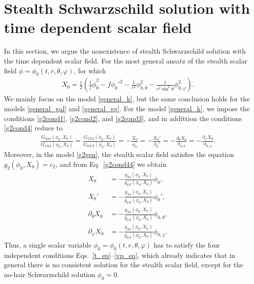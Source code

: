 \documentclass[prd,amsmath,amssymb,floatfix,superscriptaddress,notitlepage,nofootinbib,preprintnumbers]{revtex4-1}
\begin{document}
\section{Stealth Schwarzschild solution with time dependent scalar field}
\label{sec5}


In this section,
we argue the nonexistence of stealth Schwarzschild solution
with the time dependent scalar field. 
For the most general ansatz of the stealth scalar field $\phi=\phi_0(t,r,\theta,\varphi)$, for which
\begin{align}
X_0=\frac{1}{2}
\left(
      \frac{1}{f}\dot{\phi}_0^2
      -f \phi_0'^2
      -\frac{1}{r^2}\phi_{0,\theta}^2
      -\frac{1}{r^2\sin^2\theta} \phi_{0,\varphi}^2
\right).
\end{align}
We mainly focus on the model \eqref{general_k},
but the same conclusion holds
for the models \eqref{general_gal} and \eqref{general_gg}. 
For the model \eqref{general_k},
we impose the conditions \eqref{g2cond1}, \eqref{g2cond2}, and \eqref{g2cond3},
and in addittion the conditions \eqref{g2cond4} reduce to
\begin{align}
\label{g2cond44}
\frac{G_{2\phi\phi}(\phi_0,X_0)}{G_{2X\phi}(\phi_0,X_0)}
=\frac{G_{2X\phi}(\phi_0,X_0)}{G_{2XX}(\phi_0,X_0)}
=-\frac{\dot{X}_0}{\dot{\phi}_0}
=-\frac{X_0'}{\phi_0'}
=-\frac{\partial_\theta X_0}{\phi_{0,\theta}}
=-\frac{\partial_\varphi X_0}{\phi_{0,\varphi}}.
\end{align}
Moreover, in the model \eqref{g2gen},
the stealth scalar field satisfies the equation $g_2(\phi_0,X_0)=c_2$,
and from Eq.~\eqref{g2cond44} we obtain 
\begin{align}
\label{t_eq}
\dot{X}_0&= -\frac{g_{2\phi}(\phi_0,X_0)}{g_{2X} (\phi_0,X_0)}  \dot{\phi}_0,
\\
\label{r_eq}
X_0'&= -\frac{g_{2\phi} (\phi_0,X_0)}{g_{2X} (\phi_0,X_0)} \phi_0',
\\
\label{th_eq}
\partial_\theta X_0 &= -\frac{g_{2\phi} (\phi_0,X_0)}{g_{2X}(\phi_0,X_0)}  \phi_{0,\theta},
\\
\label{vp_eq}
\partial_\varphi X_0&= -\frac{g_{2\phi} (\phi_0,X_0)}{g_{2X} (\phi_0,X_0)} \phi_{0,\varphi}.
\end{align}
Thus, a single scalar variable $\phi_0=\phi_0(t,r,\theta,\varphi)$
has to satisfy 
the four independent conditions Eqs.~\eqref{t_eq}--\eqref{vp_eq},
which already indicates 
that in general
there is no consistent solution for the stealth scalar field,
except for the no-hair Schwarzschild solution $\phi_0=0$.
\end{document}
